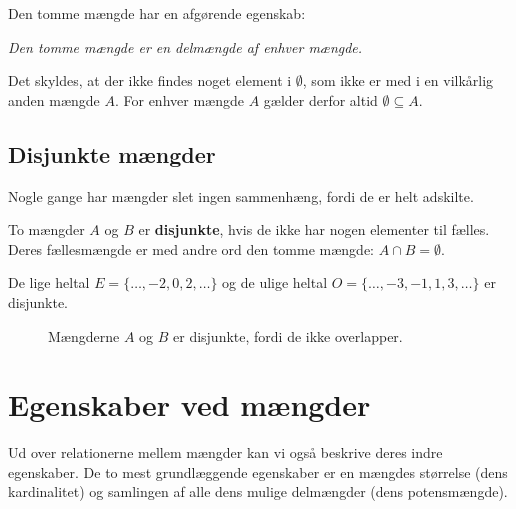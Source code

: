 Den tomme mængde har en afgørende egenskab:
\begin{center}
    \textit{Den tomme mængde er en delmængde af enhver mængde.}
\end{center}
Det skyldes, at der ikke findes noget element i $\emptyset$, som ikke er med i en vilkårlig anden mængde $A$. For enhver mængde $A$ gælder derfor altid $\emptyset \subseteq A$.

\subsection*{Disjunkte mængder}
Nogle gange har mængder slet ingen sammenhæng, fordi de er helt adskilte.

\begin{definition}
    To mængder $A$ og $B$ er \textbf{disjunkte}, hvis de ikke har nogen elementer til fælles. Deres fællesmængde er med andre ord den tomme mængde: $A \cap B = \emptyset$.
\end{definition}

De lige heltal $E = \{\dots, -2, 0, 2, \dots\}$ og de ulige heltal $O = \{\dots, -3, -1, 1, 3, \dots\}$ er disjunkte.

\begin{figure}[htbp]
    \centering
    \caption{Mængderne $A$ og $B$ er disjunkte, fordi de ikke overlapper.}
    \label{fig:disjoint_sets}
\end{figure}

\section{Egenskaber ved mængder}
Ud over relationerne mellem mængder kan vi også beskrive deres indre egenskaber. De to mest grundlæggende egenskaber er en mængdes størrelse (dens kardinalitet) og samlingen af alle dens mulige delmængder (dens potensmængde).

